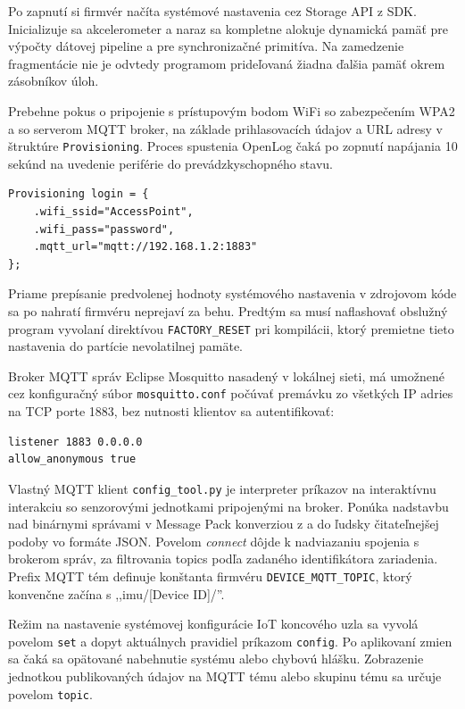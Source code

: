 Po zapnutí si firmvér načíta systémové nastavenia cez Storage API z SDK. Inicializuje sa
akcelerometer a naraz sa kompletne alokuje dynamická pamäť pre výpočty dátovej pipeline a pre synchronizačné primitíva.
Na zamedzenie fragmentácie nie je odvtedy programom prideľovaná žiadna ďalšia pamäť okrem zásobníkov úloh.

Prebehne pokus o pripojenie s prístupovým bodom WiFi so zabezpečením WPA2 a so serverom MQTT broker, na základe prihlasovacích údajov
a URL adresy v štruktúre \verb|Provisioning|. Proces spustenia OpenLog čaká po zopnutí napájania 10 sekúnd na uvedenie
periférie do prevádzkyschopného stavu.
\begin{small}
\begin{Verbatim}[frame=single, baselinestretch=1.1]
Provisioning login = {
    .wifi_ssid="AccessPoint",
    .wifi_pass="password",
    .mqtt_url="mqtt://192.168.1.2:1883"
};
\end{Verbatim}
\end{small}

Priame prepísanie predvolenej hodnoty systémového nastavenia v zdrojovom kóde
sa po nahratí firmvéru neprejaví za behu. Predtým sa musí naflashovať obslužný program vyvolaní direktívou
\verb|FACTORY_RESET| pri kompilácii, ktorý premietne tieto nastavenia do partície nevolatilnej pamäte.

Broker MQTT správ Eclipse Mosquitto nasadený v lokálnej sieti, má umožnené cez konfiguračný súbor \verb|mosquitto.conf| počúvať
premávku zo všetkých IP adries na TCP porte 1883, bez nutnosti klientov sa autentifikovať:
\begin{small}
\begin{Verbatim}[frame=single, baselinestretch=1.1]
listener 1883 0.0.0.0
allow_anonymous true
\end{Verbatim}
\end{small}

Vlastný MQTT klient \verb|config_tool.py| je interpreter príkazov na interaktívnu interakciu so senzorovými jednotkami
pripojenými na broker. Ponúka nadstavbu nad binárnymi správami v Message Pack konverziou z a do ľudsky čitateľnejšej
podoby vo formáte JSON. Povelom \emph{connect} dôjde k nadviazaniu spojenia s brokerom správ, za filtrovania topics podľa
zadaného identifikátora zariadenia. Prefix MQTT tém definuje konštanta firmvéru \verb|DEVICE_MQTT_TOPIC|, ktorý konvenčne začína
s ,,imu/[Device ID]/''.

Režim na nastavenie systémovej konfigurácie IoT koncového uzla sa vyvolá povelom \verb|set| a dopyt aktuálnych pravidiel
príkazom \verb|config|. Po aplikovaní zmien sa čaká sa opätované nabehnutie systému alebo chybovú hlášku.
Zobrazenie jednotkou publikovaných údajov na MQTT tému alebo skupinu tému sa určuje povelom \verb|topic|.

